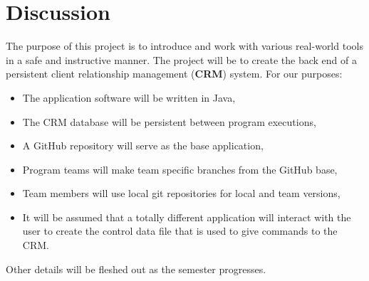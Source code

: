 \section{Discussion}
The purpose of this project is to introduce and work with various real-world tools in a safe and instructive manner.  The project will be to create the back end of a persistent client relationship management (\textbf{CRM}) system.  For our purposes:
\begin{itemize}
\item The application software will be written in Java,
\item The CRM database will be persistent between program executions,
\item A GitHub repository will serve as the base application,
  \item Program teams will make team specific branches from the GitHub base,
  \item Team members will use local git repositories for local and team versions,
    \item It will be assumed that a totally different application will interact with the user to create the control data file that is used to give commands to the CRM.
\end{itemize}

Other details will be fleshed out as the semester progresses.
